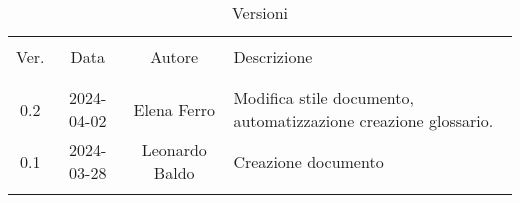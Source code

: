 \documentclass[italian,12pt]{article}
\begin{document}
    

    \newpage

    

    \begin{table}[!h]
        \caption{Versioni}
        \begin{center}
            \begin{tabular}{ c c c p{9cm} }
                \hline                                                                                               \\[-2ex]
                Ver. & Data       & Autore         & Descrizione                                                     \\
                \\[-2ex] \hline \\[-1.5ex]
                0.2  & 2024-04-02 & Elena Ferro    & Modifica stile documento, automatizzazione creazione glossario. \\
                0.1  & 2024-03-28 & Leonardo Baldo & Creazione documento                                             \\
                \\[-1.5ex] \hline
            \end{tabular}
        \end{center}
    \end{table}

    \newpage

    \tableofcontents

    \printglossary[style=myaltlistgroup,title=]
\end{document}
